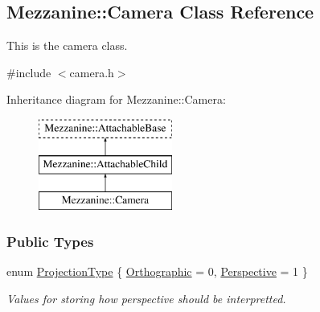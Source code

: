 \hypertarget{classMezzanine_1_1Camera}{
\subsection{Mezzanine::Camera Class Reference}
\label{classMezzanine_1_1Camera}
}


This is the camera class.  




{\ttfamily \#include $<$camera.h$>$}

Inheritance diagram for Mezzanine::Camera:\begin{figure}[H]
\begin{center}
\leavevmode
\includegraphics[height=3.000000cm]{classMezzanine_1_1Camera}
\end{center}
\end{figure}
\subsubsection*{Public Types}
\begin{DoxyCompactItemize}
\item 
enum \hyperlink{classMezzanine_1_1Camera_a643bf90630796bca5353967664d5f6e3}{ProjectionType} \{ \hyperlink{classMezzanine_1_1Camera_a643bf90630796bca5353967664d5f6e3a5bf29bb9ff44080ae6cbfa3e2aeb467c}{Orthographic} =  0, 
\hyperlink{classMezzanine_1_1Camera_a643bf90630796bca5353967664d5f6e3a616794ef1e113f63b1b9bf6896c61eba}{Perspective} =  1
 \}
\begin{DoxyCompactList}\small\item\em Values for storing how perspective should be interpretted. \item\end{DoxyCompactList}\end{DoxyCompactItemize}
